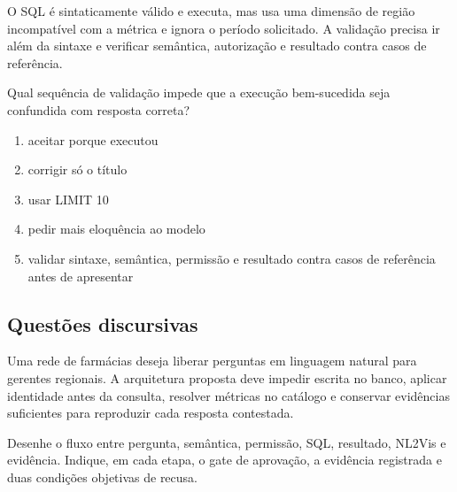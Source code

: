 \TextoBase

O SQL é sintaticamente válido e executa, mas usa uma dimensão de região incompatível com a métrica e ignora o período solicitado. A validação precisa ir além da sintaxe e verificar semântica, autorização e resultado contra casos de referência.

\FonteDidatica

\Comando Qual sequência de validação impede que a execução bem-sucedida seja confundida com resposta correta?

\begin{enumerate}[label=\Alph*)]

\item aceitar porque executou

\item corrigir só o título

\item usar LIMIT 10

\item pedir mais eloquência ao modelo

\item validar sintaxe, semântica, permissão e resultado contra casos de referência antes de apresentar

\end{enumerate}

\subsection{Questões discursivas}


\TextoBase

Uma rede de farmácias deseja liberar perguntas em linguagem natural para gerentes regionais. A arquitetura proposta deve impedir escrita no banco, aplicar identidade antes da consulta, resolver métricas no catálogo e conservar evidências suficientes para reproduzir cada resposta contestada.

\FonteDidatica

\Comando Desenhe o fluxo entre pergunta, semântica, permissão, SQL, resultado, NL2Vis e evidência. Indique, em cada etapa, o gate de aprovação, a evidência registrada e duas condições objetivas de recusa.


\TextoBase

